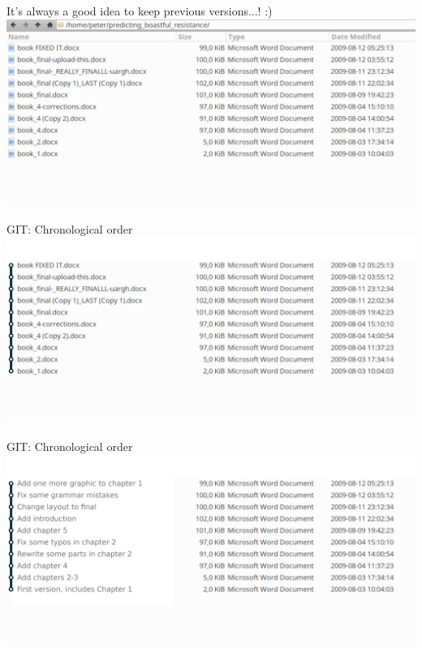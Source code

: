 \begin{frame}[fragile]{It's always a good idea to keep previous versions...! :)}
    \includegraphics[width=\textwidth]{images/screenshot-ugly-filenames-1.png}
\end{frame}


\begin{frame}[fragile]{GIT: Chronological order}
    \includegraphics[width=\textwidth]{images/screenshot-ugly-filenames-2.png}
\end{frame}


\begin{frame}[fragile]{GIT: Chronological order}
    \includegraphics[width=\textwidth]{images/screenshot-ugly-filenames-3.png}
\end{frame}


